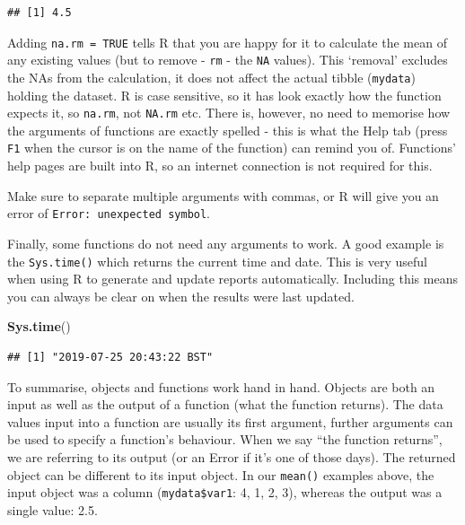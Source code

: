 \documentclass[12pt,]{krantz}
\makeatletter
\newenvironment{Shaded}{\begin{snugshade}}{\end{snugshade}}
\newcommand{\DataTypeTok}[1]{\textcolor[rgb]{0.13,0.29,0.53}{#1}}
\newcommand{\KeywordTok}[1]{\textcolor[rgb]{0.13,0.29,0.53}{\textbf{#1}}}
\newcommand{\NormalTok}[1]{#1}
\newcommand{\OperatorTok}[1]{\textcolor[rgb]{0.81,0.36,0.00}{\textbf{#1}}}
\newcommand{\OtherTok}[1]{\textcolor[rgb]{0.56,0.35,0.01}{#1}}
\renewenvironment{quote}{\begin{VF}}{\end{VF}}
\newenvironment{kframe}{%
\medskip{}
\setlength{\fboxsep}{.8em}
 \def\at@end@of@kframe{}%
 \ifinner\ifhmode%
  \def\at@end@of@kframe{\end{minipage}}%
  \begin{minipage}{\columnwidth}%
 \fi\fi%
 \def\FrameCommand##1{\hskip\@totalleftmargin \hskip-\fboxsep
 \colorbox{shadecolor}{##1}\hskip-\fboxsep
     \hskip-\linewidth \hskip-\@totalleftmargin \hskip\columnwidth}%
 \MakeFramed {\advance\hsize-\width
   \@totalleftmargin\z@ \linewidth\hsize
   \@setminipage}}%
 {\par\unskip\endMakeFramed%
 \at@end@of@kframe}
\renewenvironment{Shaded}{\begin{kframe}}{\end{kframe}}
\theoremstyle{definition}
\theoremstyle{definition}
\theoremstyle{definition}
\theoremstyle{remark}
\makeatother
\begin{document}
\begin{Shaded}
\end{Shaded}

\begin{verbatim}
## [1] 4.5
\end{verbatim}

Adding \texttt{na.rm\ =\ TRUE} tells R that you are happy for it to
calculate the mean of any existing values (but to remove - \texttt{rm} -
the \texttt{NA} values). This `removal' excludes the NAs from the
calculation, it does not affect the actual tibble (\texttt{mydata})
holding the dataset. R is case sensitive, so it has look exactly how the
function expects it, so \texttt{na.rm}, not \texttt{NA.rm} etc. There
is, however, no need to memorise how the arguments of functions are
exactly spelled - this is what the Help tab (press \texttt{F1} when the
cursor is on the name of the function) can remind you of. Functions'
help pages are built into R, so an internet connection is not required
for this.

\begin{quote}
Make sure to separate multiple arguments with commas, or R will give you
an error of \texttt{Error:\ unexpected\ symbol}.
\end{quote}

Finally, some functions do not need any arguments to work. A good
example is the \texttt{Sys.time()} which returns the current time and
date. This is very useful when using R to generate and update reports
automatically. Including this means you can always be clear on when the
results were last updated.

\begin{Shaded}
\begin{Highlighting}[]
\KeywordTok{Sys.time}\NormalTok{()}
\end{Highlighting}
\end{Shaded}

\begin{verbatim}
## [1] "2019-07-25 20:43:22 BST"
\end{verbatim}

To summarise, objects and functions work hand in hand. Objects are both
an input as well as the output of a function (what the function
returns). The data values input into a function are usually its first
argument, further arguments can be used to specify a function's
behaviour. When we say ``the function returns'', we are referring to its
output (or an Error if it's one of those days). The returned object can
be different to its input object. In our \texttt{mean()} examples above,
the input object was a column (\texttt{mydata\$var1}: 4, 1, 2, 3),
whereas the output was a single value: 2.5.
\end{document}
